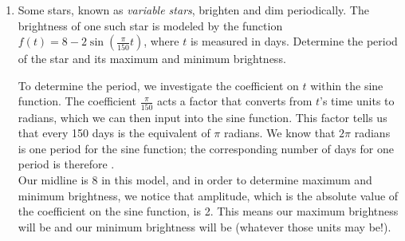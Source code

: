 \documentclass[main]{subfiles}
\begin{document}
\begin{enumerate}[resume]
\item 
\begin{problem}
Some stars, known as \emph{variable stars}, brighten and dim periodically. The brightness of one such star is modeled by the function $f(t)=8-2\sin(\frac{\pi}{150}t)$, where $t$ is measured in days. Determine the period of the star and its maximum and minimum brightness.

\end{problem}
\pspace{\vfill}
\begin{solution}
    To determine the period, we investigate the coefficient on $t$ within the sine function. The coefficient $\frac{\pi}{150}$ acts a factor that converts from $t$'s time units to radians, which we can then input into the sine function. This factor tells us that every 150 days is the equivalent of $\pi$ radians. We know that $2\pi$ radians is one period for the sine function; the corresponding number of days for one period is therefore .\\
    Our midline is 8 in this model, and in order to determine maximum and minimum brightness, we notice that amplitude, which is the absolute value of the coefficient on the sine function, is 2. This means our maximum brightness will be  and our minimum brightness will be  (whatever those units may be!).
\end{solution}
\end{enumerate}

\pspace{\newpage}
\end{document}
